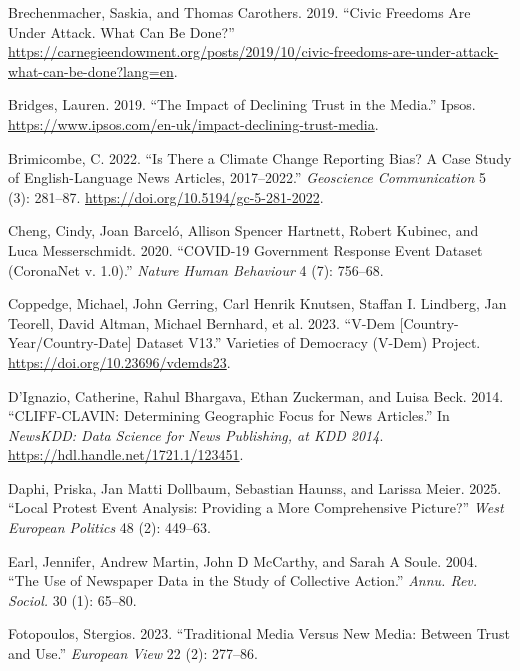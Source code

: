 \documentclass[
  letterpaper,
  DIV=11,
  numbers=noendperiod]{scrartcl}
\newlength{\cslhangindent}
\newlength{\cslentryspacingunit} %
\newenvironment{CSLReferences}[2] %
 {%
  \setlength{\parindent}{0pt}
  \ifodd #1
  \let\oldpar\par
  \def\par{\hangindent=\cslhangindent\oldpar}
  \fi
  \setlength{\parskip}{#2\cslentryspacingunit}
 }%
 {}
\begin{document}
\begin{CSLReferences}{1}{0}
\leavevmode{}%
Brechenmacher, Saskia, and Thomas Carothers. 2019. {``Civic Freedoms Are
Under Attack. What Can Be Done?''}
\url{https://carnegieendowment.org/posts/2019/10/civic-freedoms-are-under-attack-what-can-be-done?lang=en}.

\leavevmode{}%
Bridges, Lauren. 2019. {``The Impact of Declining Trust in the Media.''}
Ipsos. \url{https://www.ipsos.com/en-uk/impact-declining-trust-media}.

\leavevmode{}%
Brimicombe, C. 2022. {``Is There a Climate Change Reporting Bias? A Case
Study of English-Language News Articles, 2017--2022.''} \emph{Geoscience
Communication} 5 (3): 281--87.
\url{https://doi.org/10.5194/gc-5-281-2022}.

\leavevmode{}%
Cheng, Cindy, Joan Barceló, Allison Spencer Hartnett, Robert Kubinec,
and Luca Messerschmidt. 2020. {``COVID-19 Government Response Event
Dataset (CoronaNet v. 1.0).''} \emph{Nature Human Behaviour} 4 (7):
756--68.

\leavevmode{}%
Coppedge, Michael, John Gerring, Carl Henrik Knutsen, Staffan I.
Lindberg, Jan Teorell, David Altman, Michael Bernhard, et al. 2023.
{``V-Dem {[}Country-Year/Country-Date{]} Dataset V13.''} Varieties of
Democracy (V-Dem) Project. \url{https://doi.org/10.23696/vdemds23}.

\leavevmode{}%
D'Ignazio, Catherine, Rahul Bhargava, Ethan Zuckerman, and Luisa Beck.
2014. {``CLIFF-CLAVIN: Determining Geographic Focus for News
Articles.''} In \emph{NewsKDD: Data Science for News Publishing, at KDD
2014}. \url{https://hdl.handle.net/1721.1/123451}.

\leavevmode{}%
Daphi, Priska, Jan Matti Dollbaum, Sebastian Haunss, and Larissa Meier.
2025. {``Local Protest Event Analysis: Providing a More Comprehensive
Picture?''} \emph{West European Politics} 48 (2): 449--63.

\leavevmode{}%
Earl, Jennifer, Andrew Martin, John D McCarthy, and Sarah A Soule. 2004.
{``The Use of Newspaper Data in the Study of Collective Action.''}
\emph{Annu. Rev. Sociol.} 30 (1): 65--80.

\leavevmode{}%
Fotopoulos, Stergios. 2023. {``Traditional Media Versus New Media:
Between Trust and Use.''} \emph{European View} 22 (2): 277--86.


\end{CSLReferences}
\end{document}
